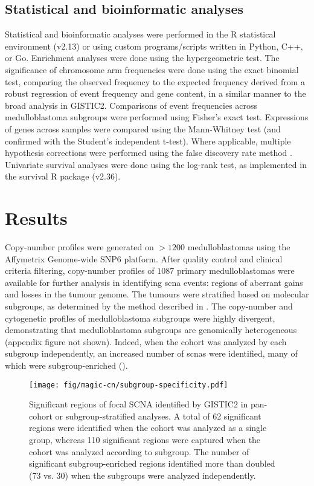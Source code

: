 \subsection{Statistical and bioinformatic analyses}

Statistical and bioinformatic analyses were performed in the R statistical environment (v2.13) or using custom programs/scripts written in Python, C++, or Go. Enrichment analyses were done using the hypergeometric test. The significance of chromosome arm frequencies were done using the exact binomial test, comparing the observed frequency to the expected frequency derived from a robust regression of event frequency and gene content, in a similar manner to the broad analysis in GISTIC2. Comparisons of event frequencies across medulloblastoma subgroups were performed using Fisher’s exact test. Expressions of genes across samples were compared using the Mann-Whitney test (and confirmed with the Student’s independent t-test). Where applicable, multiple hypothesis corrections were performed using the false discovery rate method . Univariate survival analyses were done using the log-rank test, as implemented in the survival R package (v2.36).


\section{Results}

Copy-number profiles were generated on $> 1200$ medulloblastomas using the Affymetrix Genome-wide SNP6 platform. After quality control and clinical criteria filtering, copy-number profiles of $1087$ primary medulloblastomas were available for further analysis in identifying \gls{scna} events: regions of aberrant gains and losses in the tumour genome. The tumours were stratified based on molecular subgroups, as determined by the method described in . The copy-number and cytogenetic profiles of medulloblastoma subgroups were highly divergent, demonstrating that medulloblastoma subgroups are genomically heterogeneous (appendix figure not shown). Indeed, when the cohort was analyzed by each subgroup independently, an increased number of \gls{scnas} were identified, many of which were subgroup-enriched ().

\begin{SCfigure}[5]
	\centering
	\texttt{[image: fig/magic-cn/subgroup-specificity.pdf]}
	\caption[Significant regions of focal SCNA identified by GISTIC2]
	{
	Significant regions of focal SCNA identified by GISTIC2 in pan-cohort or subgroup-stratified analyses.
	A total of 62 significant regions were identified when the cohort was analyzed as a single group, whereas 110 significant regions were captured when the cohort was analyzed according to subgroup. The number of significant subgroup-enriched regions identified more than doubled (73 vs. 30) when the subgroups were analyzed independently.
	}
	\label{fig:subgroup-specificity}
\end{SCfigure}

